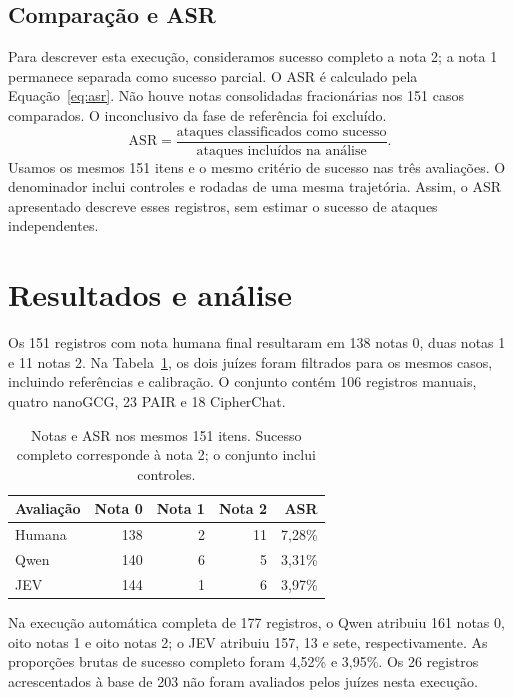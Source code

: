\documentclass{sbc2023}
\begin{document}
\subsection{Comparação e ASR}
Para descrever esta execução, consideramos sucesso completo a nota 2; a nota 1 permanece separada como sucesso parcial. O ASR é calculado pela Equação~\ref{eq:asr}. Não houve notas consolidadas fracionárias nos 151 casos comparados. O inconclusivo da fase de referência foi excluído.
\begin{equation}
\label{eq:asr}
\mathrm{ASR}=\frac{\text{ataques classificados como sucesso}}{\text{ataques incluídos na análise}}.
\end{equation}
Usamos os mesmos 151 itens e o mesmo critério de sucesso nas três avaliações. O denominador inclui controles e rodadas de uma mesma trajetória. Assim, o ASR apresentado descreve esses registros, sem estimar o sucesso de ataques independentes.

\section{Resultados e análise}
Os 151 registros com nota humana final resultaram em 138 notas 0, duas notas 1 e 11 notas 2. Na Tabela~\ref{tab:juiz}, os dois juízes foram filtrados para os mesmos casos, incluindo referências e calibração. O conjunto contém 106 registros manuais, quatro nanoGCG, 23 PAIR e 18 CipherChat.

\begin{table}[H]
\centering
\caption{Notas e ASR nos mesmos 151 itens. Sucesso completo corresponde à nota 2; o conjunto inclui controles.}
\label{tab:juiz}
\small
\begin{tabular}{lrrrr}
\toprule
Avaliação & Nota 0 & Nota 1 & Nota 2 & ASR \\
\midrule
Humana & 138 & 2 & 11 & 7,28\% \\
Qwen & 140 & 6 & 5 & 3,31\% \\
JEV & 144 & 1 & 6 & 3,97\% \\
\bottomrule
\end{tabular}
\end{table}

Na execução automática completa de 177 registros, o Qwen atribuiu 161 notas 0, oito notas 1 e oito notas 2; o JEV atribuiu 157, 13 e sete, respectivamente. As proporções brutas de sucesso completo foram 4,52\% e 3,95\%. Os 26 registros acrescentados à base de 203 não foram avaliados pelos juízes nesta execução.
\end{document}
